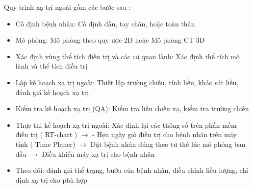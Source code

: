 \begin{enumerate}
\begin{itemize}
            \end{itemize}
            Quy trình xạ trị ngoài gồm các bước sau : 
                \begin{itemize}
                    \item Cố định bệnh nhân: Cố định đầu, tay chân, hoặc toàn thân
                    \item Mô phỏng: Mô phỏng theo quy ước 2D hoặc Mô phỏng CT 3D
                    \item Xác định vùng thể tích điều trị và các cơ quan lành: Xác định thể tích mô lành và thể tích điều trị
                    \item Lập kế hoạch xạ trị ngoài: Thiết lập trường chiếu, tính liều, khảo sát liều, đánh giá kế hoạch xạ trị
                    \item Kiểm tra kế hoạch xạ trị (QA): Kiểm tra liều chiếu xạ, kiểm tra trường chiếu
                    \item Thực thi kế hoạch xạ trị ngoài: Xác định lại các thông số trên phần mềm điều trị ( RT-chart ) $\rightarrow$ -	Hẹn ngày giờ điều trị cho bệnh nhân trên máy tính ( Time Planer) $\rightarrow$ Đặt bệnh nhân đúng theo tư thế lúc mô phỏng ban đầu $\rightarrow$ 	Điều khiển máy xạ trị cho bệnh nhân
                    \item Theo dõi: đánh giá thể trạng, bướu của bệnh nhân, điều chỉnh liều lượng, chỉ định xạ trị cho phù hợp
                \end{itemize}
        


\end{enumerate}

